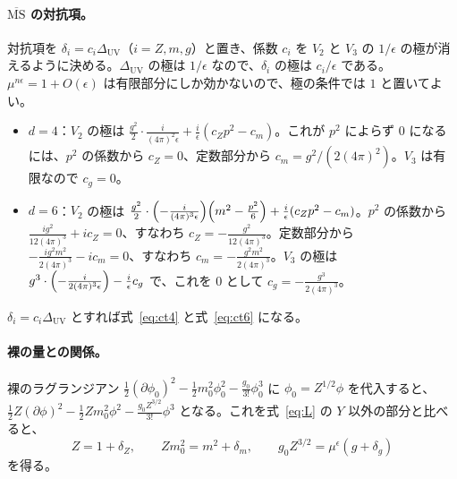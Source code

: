 \documentclass[a4paper,10pt]{ltjsarticle}
\begin{document}
\paragraph{$\overline{\mathrm{MS}}$ の対抗項。}対抗項を $\delta_i=c_i\Delta_{\mathrm{UV}}$（$i=Z,m,g$）と置き、係数 $c_i$ を $V_2$ と $V_3$ の $1/\epsilon$ の極が消えるように決める。$\Delta_{\mathrm{UV}}$ の極は $1/\epsilon$ なので、$\delta_i$ の極は $c_i/\epsilon$ である。$\mu^{n\epsilon}=1+O(\epsilon)$ は有限部分にしか効かないので、極の条件では $1$ と置いてよい。
\begin{itemize}
\item $d=4$：$V_2$ の極は $\frac{g^2}{2}\cdot\frac{i}{(4\pi)^2\epsilon}+\frac{i}{\epsilon}(c_Zp^2-c_m)$。これが $p^2$ によらず $0$ になるには、$p^2$ の係数から $c_Z=0$、定数部分から $c_m=g^2/(2(4\pi)^2)$。$V_3$ は有限なので $c_g=0$。
\item $d=6$：$V_2$ の極は $\frac{g^2}{2}\cdot\Bigl(-\frac{i}{(4\pi)^3\epsilon}\Bigr)\Bigl(m^2-\frac{p^2}{6}\Bigr)+\frac{i}{\epsilon}(c_Zp^2-c_m)$。$p^2$ の係数から $\frac{ig^2}{12(4\pi)^3}+ic_Z=0$、すなわち $c_Z=-\frac{g^2}{12(4\pi)^3}$。定数部分から $-\frac{ig^2m^2}{2(4\pi)^3}-ic_m=0$、すなわち $c_m=-\frac{g^2m^2}{2(4\pi)^3}$。$V_3$ の極は $g^3\cdot\Bigl(-\frac{i}{2(4\pi)^3\epsilon}\Bigr)-\frac{i}{\epsilon}c_g$ で、これを $0$ として $c_g=-\frac{g^3}{2(4\pi)^3}$。
\end{itemize}
$\delta_i=c_i\Delta_{\mathrm{UV}}$ とすれば式~\eqref{eq:ct4} と式~\eqref{eq:ct6} になる。

\paragraph{裸の量との関係。}裸のラグランジアン $\frac12(\partial\phi_0)^2-\frac12m_0^2\phi_0^2-\frac{g_0}{3!}\phi_0^3$ に $\phi_0=Z^{1/2}\phi$ を代入すると、$\frac12Z(\partial\phi)^2-\frac12Zm_0^2\phi^2-\frac{g_0Z^{3/2}}{3!}\phi^3$ となる。これを式~\eqref{eq:L} の $Y$ 以外の部分と比べると、
\begin{equation*}
Z=1+\delta_Z,\qquad Zm_0^2=m^2+\delta_m,\qquad g_0Z^{3/2}=\mu^\epsilon(g+\delta_g)
\end{equation*}
を得る。
\end{document}
